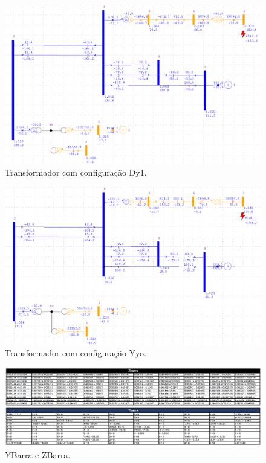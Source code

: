 \documentclass[a4paper, 12pt]{article}
\begin{document}
\begin{figure}[h]
\centering
  \includegraphics[scale=0.35]{img/ITEM 7 - CIRCUITO COM A FALTA NA BARRA 7 E TRAFO Dy1.png}
\caption{Transformador com configuração Dy1.}
\label{fig:dy1}
\end{figure}

\begin{figure}[h]
\centering
  \includegraphics[scale=0.35]{img/ITEM 7 - CIRCUITO COM A FALTA NA BARRA 7 E TRAFO Yyo.png}
\caption{Transformador com configuração Yyo.}
\label{fig:yyo}
\end{figure}





\newpage
{}
\begin{figure}[h]
\centering
  \includegraphics[scale=0.37]{img/YBarra.png}
\caption{YBarra e ZBarra.}
\label{fig:zbarra}
\end{figure}
\end{document}
